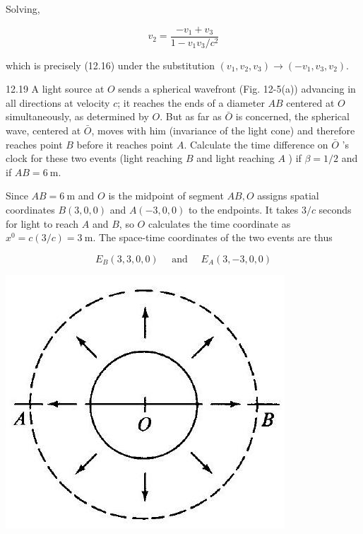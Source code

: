 \documentclass[10pt]{article}
\begin{document}
Solving,

$$
v_{2}=\frac{-v_{1}+v_{3}}{1-v_{1} v_{3} / c^{2}}
$$

which is precisely (12.16) under the substitution $\left(v_{1}, v_{2}, v_{3}\right) \rightarrow\left(-v_{1}, v_{3}, v_{2}\right)$.

12.19 A light source at $O$ sends a spherical wavefront (Fig. 12-5(a)) advancing in all directions at velocity $c$; it reaches the ends of a diameter $A B$ centered at $O$ simultaneously, as determined by $O$. But as far as $\bar{O}$ is concerned, the spherical wave, centered at $\bar{O}$, moves with him (invariance of the light cone) and therefore reaches point $B$ before it reaches point $A$. Calculate the time difference on $\bar{O}$ 's clock for these two events (light reaching $B$ and light reaching $A$ ) if $\beta=1 / 2$ and if $A B=6 \mathrm{~m}$.

Since $A B=6 \mathrm{~m}$ and $O$ is the midpoint of segment $A B, O$ assigns spatial coordinates $B(3,0,0)$ and $A(-3,0,0)$ to the endpoints. It takes $3 / c$ seconds for light to reach $A$ and $B$, so $O$ calculates the time coordinate as $x^{0}=c(3 / c)=3 \mathrm{~m}$. The space-time coordinates of the two events are thus

$$
E_{B}(3,3,0,0) \quad \text { and } \quad E_{A}(3,-3,0,0)
$$

\begin{center}
\includegraphics[max width=\textwidth]{2024_04_03_41f90be4f896e21f0dc9g-189}
\end{center}
\end{document}
